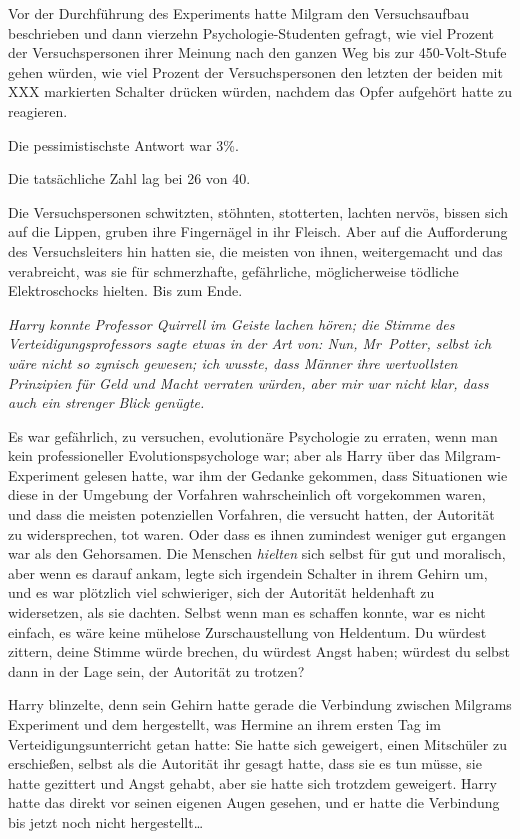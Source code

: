 {Vor der Durchführung des Experiments hatte Milgram den Versuchsaufbau beschrieben und dann vierzehn Psychologie-Studenten gefragt, wie viel Prozent der Versuchspersonen ihrer Meinung nach den ganzen Weg bis zur 450-Volt-Stufe gehen würden, wie viel Prozent der Versuchspersonen den letzten der beiden mit XXX markierten Schalter drücken würden, nachdem das Opfer aufgehört hatte zu reagieren.

Die pessimistischste Antwort war 3\%.

Die tatsächliche Zahl lag bei 26 von 40.

Die Versuchspersonen schwitzten, stöhnten, stotterten, lachten nervös, bissen sich auf die Lippen, gruben ihre Fingernägel in ihr Fleisch. Aber auf die Aufforderung des Versuchsleiters hin hatten sie, die meisten von ihnen, weitergemacht und das verabreicht, was sie für schmerzhafte, gefährliche, möglicherweise tödliche Elektroschocks hielten. Bis zum Ende.

\emph{Harry konnte Professor Quirrell im Geiste lachen hören; die Stimme des Verteidigungsprofessors sagte etwas in der Art von: \emph{Nun, Mr~Potter, selbst ich wäre} \emph{nicht so zynisch gewesen; ich wusste, dass Männer ihre wertvollsten Prinzipien für Geld und Macht verraten würden, aber mir war nicht klar, dass auch ein strenger Blick genügte.}}

Es war gefährlich, zu versuchen, evolutionäre Psychologie zu erraten, wenn man kein professioneller Evolutionspsychologe war; aber als Harry über das Milgram-Experiment gelesen hatte, war ihm der Gedanke gekommen, dass Situationen wie diese in der Umgebung der Vorfahren wahrscheinlich oft vorgekommen waren, und dass die meisten potenziellen Vorfahren, die versucht hatten, der Autorität zu widersprechen, tot waren. Oder dass es ihnen zumindest weniger gut ergangen war als den Gehorsamen. Die Menschen \emph{hielten} sich selbst für gut und moralisch, aber wenn es darauf ankam, legte sich irgendein Schalter in ihrem Gehirn um, und es war plötzlich viel schwieriger, sich der Autorität heldenhaft zu widersetzen, als sie dachten. Selbst wenn man es schaffen konnte, war es nicht einfach, es wäre keine mühelose Zurschaustellung von Heldentum. Du würdest zittern, deine Stimme würde brechen, du würdest Angst haben; würdest du selbst dann in der Lage sein, der Autorität zu trotzen?

Harry blinzelte, denn sein Gehirn hatte gerade die Verbindung zwischen Milgrams Experiment und dem hergestellt, was Hermine an ihrem ersten Tag im Verteidigungsunterricht getan hatte: Sie hatte sich geweigert, einen Mitschüler zu erschießen, selbst als die Autorität ihr gesagt hatte, dass sie es tun müsse, sie hatte gezittert und Angst gehabt, aber sie hatte sich trotzdem geweigert. Harry hatte das direkt vor seinen eigenen Augen gesehen, und er hatte die Verbindung bis jetzt noch nicht hergestellt…

}
